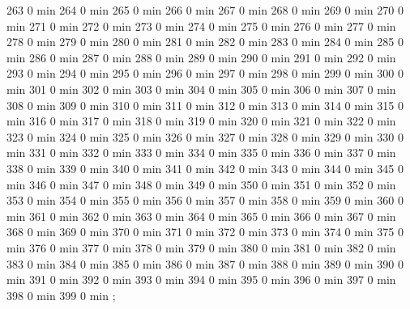 {263 0 min
264 0 min
265 0 min
266 0 min
267 0 min
268 0 min
269 0 min
270 0 min
271 0 min
272 0 min
273 0 min
274 0 min
275 0 min
276 0 min
277 0 min
278 0 min
279 0 min
280 0 min
281 0 min
282 0 min
283 0 min
284 0 min
285 0 min
286 0 min
287 0 min
288 0 min
289 0 min
290 0 min
291 0 min
292 0 min
293 0 min
294 0 min
295 0 min
296 0 min
297 0 min
298 0 min
299 0 min
300 0 min
301 0 min
302 0 min
303 0 min
304 0 min
305 0 min
306 0 min
307 0 min
308 0 min
309 0 min
310 0 min
311 0 min
312 0 min
313 0 min
314 0 min
315 0 min
316 0 min
317 0 min
318 0 min
319 0 min
320 0 min
321 0 min
322 0 min
323 0 min
324 0 min
325 0 min
326 0 min
327 0 min
328 0 min
329 0 min
330 0 min
331 0 min
332 0 min
333 0 min
334 0 min
335 0 min
336 0 min
337 0 min
338 0 min
339 0 min
340 0 min
341 0 min
342 0 min
343 0 min
344 0 min
345 0 min
346 0 min
347 0 min
348 0 min
349 0 min
350 0 min
351 0 min
352 0 min
353 0 min
354 0 min
355 0 min
356 0 min
357 0 min
358 0 min
359 0 min
360 0 min
361 0 min
362 0 min
363 0 min
364 0 min
365 0 min
366 0 min
367 0 min
368 0 min
369 0 min
370 0 min
371 0 min
372 0 min
373 0 min
374 0 min
375 0 min
376 0 min
377 0 min
378 0 min
379 0 min
380 0 min
381 0 min
382 0 min
383 0 min
384 0 min
385 0 min
386 0 min
387 0 min
388 0 min
389 0 min
390 0 min
391 0 min
392 0 min
393 0 min
394 0 min
395 0 min
396 0 min
397 0 min
398 0 min
399 0 min
};
